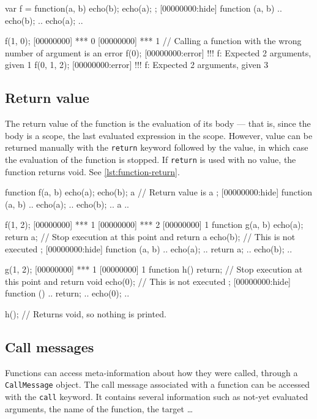 \begin{urbiscript}[caption=Storing and calling
  functions,label=lst:function-args,float=\floatpos]
var f = function(a, b) {
  echo(b);
  echo(a);
};
[00000000:hide] function (a, b) {
..  echo(b);
..  echo(a);
..}

f(1, 0);
[00000000] *** 0
[00000000] *** 1
// Calling a function with the wrong number of argument is an error
f(0);
[00000000:error] !!! f: Expected 2 arguments, given 1
f(0, 1, 2);
[00000000:error] !!! f: Expected 2 arguments, given 3
\end{urbiscript}

\subsection{Return value}

The return value of the function is the evaluation of its body --- that
is, since the body is a scope, the last evaluated expression in the
scope. However, value can be returned manually with the
\lstinline|return| keyword followed by the value, in which case the
evaluation of the function is stopped. If \lstinline|return| is used
with no value, the function returns void. See \autoref{lst:function-return}.

\begin{urbiscript}[caption=Returning values from functions,
  label=lst:function-return,float=\floatpos]
function f(a, b)
{
  echo(a);
  echo(b);
  a // Return value is a
};
[00000000:hide] function (a, b) {
..  echo(a);
..  echo(b);
..  a
..}

f(1, 2);
[00000000] *** 1
[00000000] *** 2
[00000000] 1
function g(a, b)
{
  echo(a);
  return a; // Stop execution at this point and return a
  echo(b); // This is not executed
};
[00000000:hide] function (a, b) {
..  echo(a);
..  return a;
..  echo(b);
..}

g(1, 2);
[00000000] *** 1
[00000000] 1
function h()
{
  return; // Stop execution at this point and return void
  echo(0); // This is not executed
};
[00000000:hide] function () {
..  return;
..  echo(0);
..}

h(); // Returns void, so nothing is printed.
\end{urbiscript}

\subsection{Call messages}
\label{sec:us-fun-callmsg}

Functions can access meta-information about how they were called,
through a \lstinline|CallMessage| object. The call message associated
with a function can be accessed with the \lstinline|call| keyword. It
contains several information such as not-yet evaluated arguments, the
name of the function, the target \ldots

